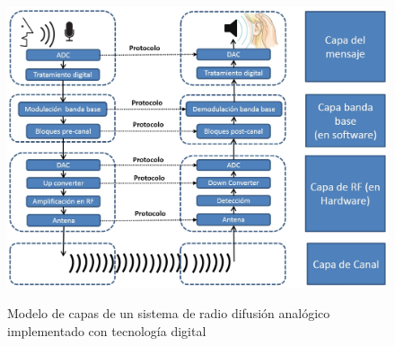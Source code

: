 \begin{figure}[h!]
	\captionsetup{justification = raggedright, singlelinecheck = false}
	\caption{Modelo de capas de un sistema de radio difusión analógico implementado con tecnología digital} 
	\centering
	\includegraphics[scale=0.45]{Imagenes/ModeloRadiodifusionSDR}
	\label{fig:ModeloRadiodifusionSDR}
\end{figure}


